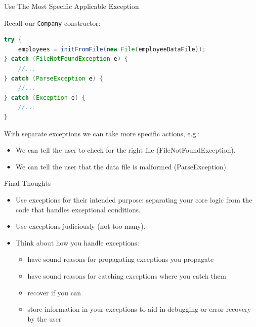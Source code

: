 \documentclass{beamer}
\begin{document}
\begin{frame}[fragile]{Use The Most Specific Applicable Exception}


Recall our {\tt Company} constructor:
\begin{lstlisting}[language=Java]
try {
    employees = initFromFile(new File(employeeDataFile));
} catch (FileNotFoundException e) {
    //...
} catch (ParseException e) {
    //...
} catch (Exception e) {
    //...
}
\end{lstlisting}
With separate exceptions we can take more specific actions, e.g.:
\begin{itemize}
\item We can tell the user to check for the right file (FileNotFoundException).
\item We can tell the user that the data file is malformed (ParseException).
\end{itemize}


\end{frame}

\begin{frame}[fragile]{Final Thoughts}

\begin{itemize}
\item Use exceptions for their intended purpose: separating your core logic from the code that handles exceptional conditions.
\item Use exceptions judiciously (not too many).
\item Think about how you handle exceptions:
\begin{itemize}
\item have sound reasons for propagating exceptions you propagate
\item have sound reasons for catching exceptions where you catch them
\item recover if you can
\item store information in your exceptions to aid in debugging or error recovery by the user
\end{itemize}
\end{itemize}


\end{frame}







\end{document}
